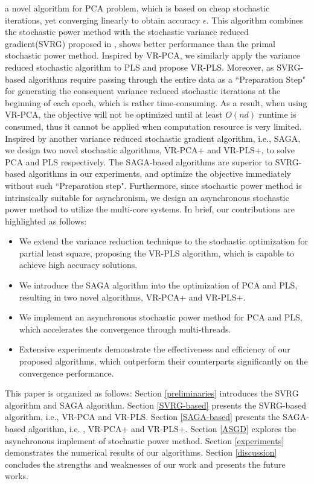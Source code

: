 \documentclass[conference]{IEEEtran}
\begin{document}
a novel algorithm for PCA problem, which is based on cheap stochastic iterations, yet converging linearly to obtain accuracy $\epsilon$. This algorithm combines the stochastic power method with the stochastic variance reduced gradient(SVRG) proposed in \citep{IEEE2013Accelerating}, shows better performance than the primal stochastic power method. Inspired by VR-PCA, we similarly apply the variance reduced stochastic algorithm to PLS and propose VR-PLS. Moreover, as SVRG-based algorithms require passing through the entire data as a ``Preparation Step" for generating the consequent variance reduced stochastic iterations at the beginning of each epoch, which is rather time-consuming. As a result, when using VR-PCA, the objective will not be optimized until at least $O(nd)$ runtime is consumed, thus it cannot be applied when computation resource is very limited. Inspired by another variance reduced stochastic gradient algorithm, i.e., SAGA\citep{Defazio2014SAGA}, we design two novel stochastic algorithms, VR-PCA+ and VR-PLS+, to solve PCA and PLS respectively. The SAGA-based algorithms are superior to SVRG-based algorithms in our experiments, and optimize the objective immediately without such ``Preparation step". Furthermore, since stochastic power method is intrinsically suitable for asynchronism, we design an asynchronous stochastic power method to utilize the multi-core systems.
In brief, our contributions are highlighted as follows:
\begin {itemize}
\item We extend the variance reduction technique to the stochastic optimization for partial least square, proposing the  VR-PLS algorithm, which is capable to achieve high accuracy solutions.
\item We introduce the SAGA algorithm into the optimization of PCA and PLS, resulting in two novel algorithms, VR-PCA+ and VR-PLS+.
\item We implement an asynchronous stochastic power method for PCA and PLS, which accelerates the convergence through multi-threads.
\item Extensive experiments demonstrate the effectiveness and efficiency of our proposed algorithms, which outperform their counterparts significantly on the convergence performance.
\end {itemize}

This paper is organized as follows: 
Section \ref{preliminaries} introduces the SVRG algorithm and SAGA algorithm. Section \ref{SVRG-based} presents the SVRG-based algorithm, i.e., VR-PCA and VR-PLS. Section  \ref{SAGA-based} presents the SAGA-based algorithm, i.e. , VR-PCA+ and VR-PLS+. Section \ref{ASGD} explores the asynchronous implement of stochastic power method. Section \ref{experiments} demonstrates the numerical results of our algorithms. Section \ref{discussion} concludes the strengths and weaknesses of our work and presents the future works.
\end{document}
